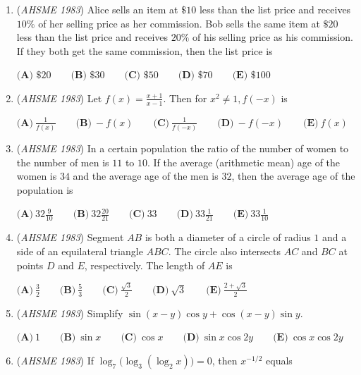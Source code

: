 \begin{enumerate}
 $\textbf{(A)}\ 2\qquad \textbf{(B)}\ 3\qquad \textbf{(C)}\ 6\qquad \textbf{(D)}\ 7\qquad \textbf{(E)}\ 8$


	\item (\textit{AHSME 1983}) Alice sells an item at $\$10$ less than the list price and receives $10\%$ of her selling price as her commission. 
Bob sells the same item at $\$20$ less than the list price and receives $20\%$ of his selling price as his commission. 
If they both get the same commission, then the list price is


 $\textbf{(A) } \$20\qquad \textbf{(B) } \$30\qquad \textbf{(C) } \$50\qquad \textbf{(D) } \$70\qquad \textbf{(E) } \$100$


	\item (\textit{AHSME 1983}) Let $f(x) = \frac{x+1}{x-1}$. Then for $x^2 \neq 1, f(-x)$ is


 $\textbf{(A)}\ \frac{1}{f(x)}\qquad \textbf{(B)}\ -f(x)\qquad \textbf{(C)}\ \frac{1}{f(-x)}\qquad \textbf{(D)}\ -f(-x)\qquad \textbf{(E)}\ f(x)$


	\item (\textit{AHSME 1983}) In a certain population the ratio of the number of women to the number of men is $11$ to $10$. 
If the average (arithmetic mean) age of the women is $34$ and the average age of the men is $32$, 
then the average age of the population is


 $\textbf{(A)}\ 32\frac{9}{10}\qquad \textbf{(B)}\ 32\frac{20}{21}\qquad \textbf{(C)}\ 33\qquad \textbf{(D)}\ 33\frac{1}{21}\qquad \textbf{(E)}\ 33\frac{1}{10}$


	\item (\textit{AHSME 1983}) Segment $AB$ is both a diameter of a circle of radius $1$ and a side of an equilateral triangle $ABC$. 
The circle also intersects $AC$ and $BC$ at points $D$ and $E$, respectively. The length of $AE$ is 


 $\textbf{(A)} \ \frac{3}{2} \qquad  \textbf{(B)} \ \frac{5}{3} \qquad  \textbf{(C)} \ \frac{\sqrt 3}{2} \qquad  \textbf{(D)}\ \sqrt{3}\qquad \textbf{(E)}\ \frac{2+\sqrt 3}{2}$


	\item (\textit{AHSME 1983}) Simplify $\sin (x-y) \cos y + \cos (x-y) \sin y$.


 $\textbf{(A)}\ 1\qquad \textbf{(B)}\ \sin x\qquad \textbf{(C)}\ \cos x\qquad \textbf{(D)}\ \sin x \cos 2y\qquad \textbf{(E)}\ \cos x\cos 2y$


	\item (\textit{AHSME 1983}) If $\log_7 \Big(\log_3 (\log_2 x) \Big) = 0$, then $x^{-1/2}$ equals 



\end{enumerate}
